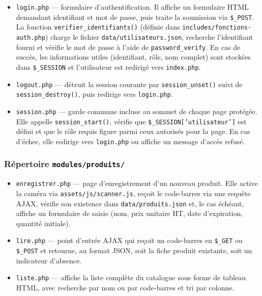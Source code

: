 \documentclass[12pt,a4paper]{article}
\begin{document}
\begin{itemize}[leftmargin=1.5em]
    \item \texttt{login.php} --- formulaire d'authentification. Il affiche un formulaire HTML demandant identifiant et mot de passe, puis traite la soumission via \texttt{\$\_POST}. La fonction \texttt{verifier\_identifiants()} (définie dans \texttt{includes/fonctions-auth.php}) charge le fichier \texttt{data/utilisateurs.json}, recherche l'identifiant fourni et vérifie le mot de passe à l'aide de \texttt{password\_verify}. En cas de succès, les informations utiles (identifiant, rôle, nom complet) sont stockées dans \texttt{\$\_SESSION} et l'utilisateur est redirigé vers \texttt{index.php}.
    \item \texttt{logout.php} --- détruit la session courante par \texttt{session\_unset()} suivi de \texttt{session\_destroy()}, puis redirige vers \texttt{login.php}.
    \item \texttt{session.php} --- garde commune incluse au sommet de chaque page protégée. Elle appelle \texttt{session\_start()}, vérifie que \texttt{\$\_SESSION['utilisateur']} est défini et que le rôle requis figure parmi ceux autorisés pour la page. En cas d'échec, elle redirige vers \texttt{login.php} ou affiche un message d'accès refusé.
\end{itemize}

\subsubsection{Répertoire \texttt{modules/produits/}}

\begin{itemize}[leftmargin=1.5em]
    \item \texttt{enregistrer.php} --- page d'enregistrement d'un nouveau produit. Elle active la caméra via \texttt{assets/js/scanner.js}, reçoit le code-barres via une requête AJAX, vérifie son existence dans \texttt{data/produits.json} et, le cas échéant, affiche un formulaire de saisie (nom, prix unitaire HT, date d'expiration, quantité initiale).
    \item \texttt{lire.php} --- point d'entrée AJAX qui reçoit un code-barres en \texttt{\$\_GET} ou \texttt{\$\_POST} et retourne, au format JSON, soit la fiche produit existante, soit un indicateur d'absence.
    \item \texttt{liste.php} --- affiche la liste complète du catalogue sous forme de tableau HTML, avec recherche par nom ou par code-barres et tri par colonne.
\end{itemize}
\end{document}
